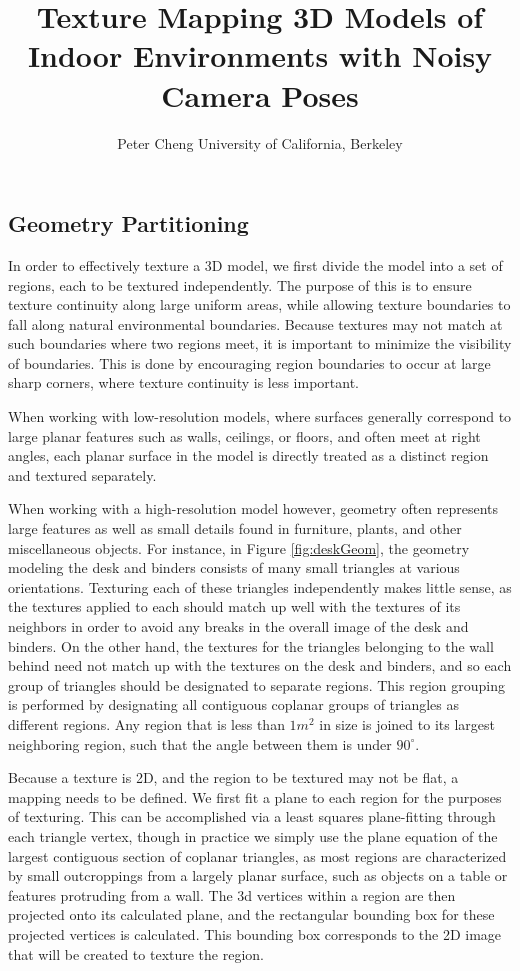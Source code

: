 \message{ !name(masters.tex)}\documentclass[]{spie}  %
\title{Texture Mapping 3D Models of Indoor Environments with Noisy Camera Poses}
\author{Peter Cheng
\skiplinehalf
University of California, Berkeley\\
}
\begin{document}
\subsection{Geometry Partitioning}
\label{sec:geometryPartioning}
In order to effectively texture a 3D model, we first divide the model
into a set of regions, each to be textured independently. The purpose
of this is to ensure texture continuity along large uniform areas,
while allowing texture boundaries to fall along natural environmental
boundaries. Because textures may not match at such boundaries where
two regions meet, it is important to minimize the visibility of
boundaries. This is done by encouraging region boundaries to occur at
large sharp corners, where texture continuity is less important.

When working with low-resolution models, where surfaces generally
correspond to large planar features such as walls, ceilings, or
floors, and often meet at right angles, each planar surface in the
model is directly treated as a distinct region and textured
separately.

When working with a high-resolution model however, geometry often
represents large features as well as small details found in furniture,
plants, and other miscellaneous objects. For instance, in Figure
\ref{fig:deskGeom}, the geometry modeling the desk and binders
consists of many small triangles at various orientations. Texturing
each of these triangles independently makes little sense, as the
textures applied to each should match up well with the textures of its
neighbors in order to avoid any breaks in the overall image of the
desk and binders. On the other hand, the textures for the triangles
belonging to the wall behind need not match up with the textures on
the desk and binders, and so each group of triangles should be
designated to separate regions. This region grouping is performed by designating all contiguous coplanar groups of triangles as different regions. Any region that is less than $1 m^2$ in size is joined to its largest neighboring region, such that the angle between them is under $90^{\circ}$.

Because a texture is 2D, and the region to be textured may not be
flat, a mapping needs to be defined. We first fit a plane to each
region for the purposes of texturing. This can be accomplished via a
least squares plane-fitting through each triangle vertex, though in
practice we simply use the plane equation of the largest contiguous
section of coplanar triangles, as most regions are characterized by
small outcroppings from a largely planar surface, such as objects on a
table or features protruding from a wall. The 3d vertices within a
region are then projected onto its calculated plane, and the
rectangular bounding box for these projected vertices is
calculated. This bounding box corresponds to the 2D image that will be
created to texture the region.
\end{document}
